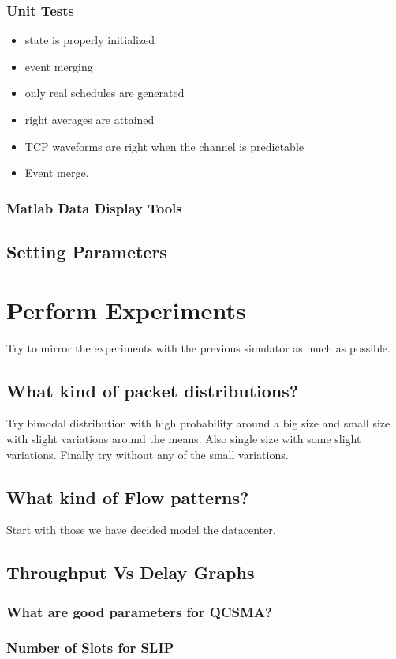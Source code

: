 \documentclass{IEEEtran}%
\begin{document}
\subsubsection{Unit Tests}
\begin{itemize}
\item state is properly initialized
\item event merging
\item only real schedules are generated
\item right averages are attained
\item TCP waveforms are right when the channel is predictable
\item Event merge.
\end{itemize}
\subsubsection{Matlab Data Display Tools}
\subsection{Setting Parameters}


\section{Perform Experiments}

Try to mirror the experiments with the previous simulator as much as possible.
\subsection{What kind of packet distributions?}
Try bimodal distribution with high probability around a big size and small size with slight variations around the means.  Also single size with some slight variations.  Finally try without any of the small variations.
\subsection{What kind of Flow patterns?}
Start with those we have decided model the datacenter.
\subsection{Throughput Vs Delay Graphs}
\subsubsection{What are good parameters for QCSMA?}
\subsubsection{Number of Slots for SLIP}
\end{document}
